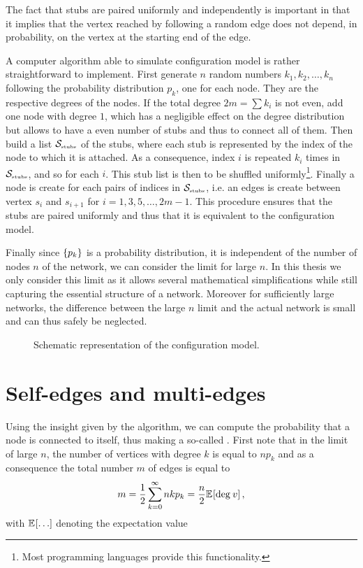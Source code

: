 \documentclass[
11pt, %
english, %
singlespacing, %
nolistspacing, %
liststotoc, %
headsepline, %
]{MastersDoctoralThesis} %
\begin{document}
The fact that stubs are paired uniformly and independently is important in that it implies that the vertex reached by following a random edge does not depend, in probability, on the vertex at the starting end of the edge.

A computer algorithm able to simulate configuration model is rather straightforward to implement. First generate $n$ random numbers $k_1, k_2, \dots, k_n$ following the probability distribution $p_k$, one for each node. They are the respective degrees of the nodes. If the total degree $2m = \sum k_i$ is not even, add one node with degree $1$, which has a negligible effect on the degree distribution but allows to have a even number of stubs and thus to connect all of them. Then build a list $\mathcal{S}_{\text{\tiny stubs}}$ of the stubs, where each stub is represented by the index of the node to which it is attached. As a consequence, index $i$ is repeated $k_i$ times in $\mathcal{S}_{\text{\tiny stubs}}$, and so for each $i$. This stub list is then to be shuffled uniformly\footnote{Most programming languages provide this functionality.}. Finally a node is create for each pairs of indices in $\mathcal{S}_{\text{\tiny stubs}}$, i.e. an edges is create between vertex $s_i$ and $s_{i + 1}$ for $i = 1, 3, 5, \dots, 2m - 1$. This procedure ensures that the stubs are paired uniformly and thus that it is equivalent to the configuration model.

Finally since $\{p_k\}$ is a probability distribution, it is independent of the number of nodes $n$ of the network, we can consider the limit for large $n$. In this thesis we only consider this limit as it allows several mathematical simplifications while still capturing the essential structure of a network. Moreover for sufficiently large networks, the difference between the large $n$ limit and the actual network is small and can thus safely be neglected.

\begin{figure}
	
	\caption{Schematic representation of the configuration model.}
	\label{Figure: Configuration model}
\end{figure}

\section{Self-edges and multi-edges}

Using the insight given by the algorithm, we can compute the probability that a node is connected to itself, thus making a so-called . First note that in the limit of large $n$, the number of vertices with degree $k$ is equal to $n p_k$ and as a consequence the total number $m$ of edges is equal to
\begin{align}
	m = \frac{1}{2} \sum_{k = 0}^\infty n k p_k = \frac{n}{2} \mathbb{E}_{}\!\left[ \mathrm{deg}_{}\, v \right], \label{Total number of edges}
\end{align}
with $\expected{\dots}$ denoting the expectation value
\end{document}
